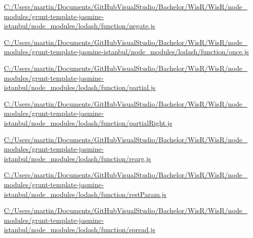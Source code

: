 \begin{DoxyCompactItemize}
\item 
\hyperlink{_c_1_2_users_2martin_2_documents_2_git_hub_visual_studio_2_bachelor_2_wis_r_2_wis_r_2node_module21b4d96ed5a14c16f48c27b4539e4eef}{C\+:/\+Users/martin/\+Documents/\+Git\+Hub\+Visual\+Studio/\+Bachelor/\+Wis\+R/\+Wis\+R/node\+\_\+modules/grunt-\/template-\/jasmine-\/istanbul/node\+\_\+modules/lodash/function/negate.\+js}
\item 
\hyperlink{_c_1_2_users_2martin_2_documents_2_git_hub_visual_studio_2_bachelor_2_wis_r_2_wis_r_2node_module6c41b0634a9b1251f449a7abc00e73e0}{C\+:/\+Users/martin/\+Documents/\+Git\+Hub\+Visual\+Studio/\+Bachelor/\+Wis\+R/\+Wis\+R/node\+\_\+modules/grunt-\/template-\/jasmine-\/istanbul/node\+\_\+modules/lodash/function/once.\+js}
\item 
\hyperlink{_c_1_2_users_2martin_2_documents_2_git_hub_visual_studio_2_bachelor_2_wis_r_2_wis_r_2node_module4d3a2a77f2786a69d0c146e259bc0336}{C\+:/\+Users/martin/\+Documents/\+Git\+Hub\+Visual\+Studio/\+Bachelor/\+Wis\+R/\+Wis\+R/node\+\_\+modules/grunt-\/template-\/jasmine-\/istanbul/node\+\_\+modules/lodash/function/partial.\+js}
\item 
\hyperlink{_c_1_2_users_2martin_2_documents_2_git_hub_visual_studio_2_bachelor_2_wis_r_2_wis_r_2node_modulef200bd8a802bf219aacfe08f4e1bb672}{C\+:/\+Users/martin/\+Documents/\+Git\+Hub\+Visual\+Studio/\+Bachelor/\+Wis\+R/\+Wis\+R/node\+\_\+modules/grunt-\/template-\/jasmine-\/istanbul/node\+\_\+modules/lodash/function/partial\+Right.\+js}
\item 
\hyperlink{_c_1_2_users_2martin_2_documents_2_git_hub_visual_studio_2_bachelor_2_wis_r_2_wis_r_2node_module2fd3ebfac7c829aecf11c49bf816ca07}{C\+:/\+Users/martin/\+Documents/\+Git\+Hub\+Visual\+Studio/\+Bachelor/\+Wis\+R/\+Wis\+R/node\+\_\+modules/grunt-\/template-\/jasmine-\/istanbul/node\+\_\+modules/lodash/function/rearg.\+js}
\item 
\hyperlink{_c_1_2_users_2martin_2_documents_2_git_hub_visual_studio_2_bachelor_2_wis_r_2_wis_r_2node_modulea407bb2d16a3bdc9d6de2061f81bfc00}{C\+:/\+Users/martin/\+Documents/\+Git\+Hub\+Visual\+Studio/\+Bachelor/\+Wis\+R/\+Wis\+R/node\+\_\+modules/grunt-\/template-\/jasmine-\/istanbul/node\+\_\+modules/lodash/function/rest\+Param.\+js}
\item 
\hyperlink{_c_1_2_users_2martin_2_documents_2_git_hub_visual_studio_2_bachelor_2_wis_r_2_wis_r_2node_moduledd8546a9fdd71b66a049e9e09d68138d}{C\+:/\+Users/martin/\+Documents/\+Git\+Hub\+Visual\+Studio/\+Bachelor/\+Wis\+R/\+Wis\+R/node\+\_\+modules/grunt-\/template-\/jasmine-\/istanbul/node\+\_\+modules/lodash/function/spread.\+js}

\end{DoxyCompactItemize}
